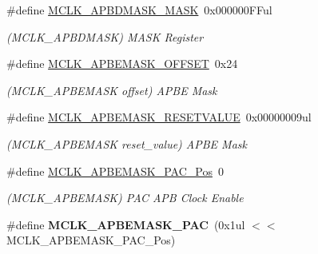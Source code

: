 \begin{DoxyCompactItemize}
\item 
\hypertarget{group___s_a_m_l21___m_c_l_k_gad7749cd8272a2d7fdb3faaeaa99e5268}{}\#define \hyperlink{group___s_a_m_l21___m_c_l_k_gad7749cd8272a2d7fdb3faaeaa99e5268}{M\+C\+L\+K\+\_\+\+A\+P\+B\+D\+M\+A\+S\+K\+\_\+\+M\+A\+S\+K}~0x000000\+F\+Ful\label{group___s_a_m_l21___m_c_l_k_gad7749cd8272a2d7fdb3faaeaa99e5268}

\begin{DoxyCompactList}\small\item\em (M\+C\+L\+K\+\_\+\+A\+P\+B\+D\+M\+A\+S\+K) M\+A\+S\+K Register \end{DoxyCompactList}\item 
\hypertarget{group___s_a_m_l21___m_c_l_k_ga55abce5cac818f3855f42fb5f7466225}{}\#define \hyperlink{group___s_a_m_l21___m_c_l_k_ga55abce5cac818f3855f42fb5f7466225}{M\+C\+L\+K\+\_\+\+A\+P\+B\+E\+M\+A\+S\+K\+\_\+\+O\+F\+F\+S\+E\+T}~0x24\label{group___s_a_m_l21___m_c_l_k_ga55abce5cac818f3855f42fb5f7466225}

\begin{DoxyCompactList}\small\item\em (M\+C\+L\+K\+\_\+\+A\+P\+B\+E\+M\+A\+S\+K offset) A\+P\+B\+E Mask \end{DoxyCompactList}\item 
\hypertarget{group___s_a_m_l21___m_c_l_k_gadc53205cf8aae62a6f0aaa180cfc2da2}{}\#define \hyperlink{group___s_a_m_l21___m_c_l_k_gadc53205cf8aae62a6f0aaa180cfc2da2}{M\+C\+L\+K\+\_\+\+A\+P\+B\+E\+M\+A\+S\+K\+\_\+\+R\+E\+S\+E\+T\+V\+A\+L\+U\+E}~0x00000009ul\label{group___s_a_m_l21___m_c_l_k_gadc53205cf8aae62a6f0aaa180cfc2da2}

\begin{DoxyCompactList}\small\item\em (M\+C\+L\+K\+\_\+\+A\+P\+B\+E\+M\+A\+S\+K reset\+\_\+value) A\+P\+B\+E Mask \end{DoxyCompactList}\item 
\hypertarget{group___s_a_m_l21___m_c_l_k_ga353e18deab55ff7de5b4294c60185ed8}{}\#define \hyperlink{group___s_a_m_l21___m_c_l_k_ga353e18deab55ff7de5b4294c60185ed8}{M\+C\+L\+K\+\_\+\+A\+P\+B\+E\+M\+A\+S\+K\+\_\+\+P\+A\+C\+\_\+\+Pos}~0\label{group___s_a_m_l21___m_c_l_k_ga353e18deab55ff7de5b4294c60185ed8}

\begin{DoxyCompactList}\small\item\em (M\+C\+L\+K\+\_\+\+A\+P\+B\+E\+M\+A\+S\+K) P\+A\+C A\+P\+B Clock Enable \end{DoxyCompactList}\item 
\hypertarget{group___s_a_m_l21___m_c_l_k_ga766c196f627ecd3887e8ce1c722bec50}{}\#define {\bfseries M\+C\+L\+K\+\_\+\+A\+P\+B\+E\+M\+A\+S\+K\+\_\+\+P\+A\+C}~(0x1ul $<$$<$ M\+C\+L\+K\+\_\+\+A\+P\+B\+E\+M\+A\+S\+K\+\_\+\+P\+A\+C\+\_\+\+Pos)\label{group___s_a_m_l21___m_c_l_k_ga766c196f627ecd3887e8ce1c722bec50}


\end{DoxyCompactItemize}
